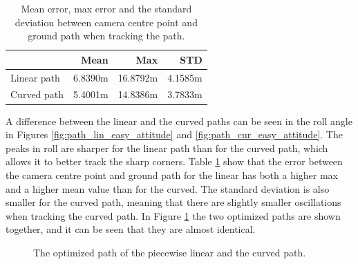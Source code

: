\begin{table}
\centering
\begin{tabular}{l r r r}
    \hline
    & Mean & Max  & STD \\
    \hline
    Linear path & 6.8390m & 16.8792m & 4.1585m \\
    Curved path & 5.4001m & 14.8386m & 3.7833m \\
    \hline
\end{tabular}
\caption{Mean error, max error and the standard deviation between camera centre point and ground path when tracking the path.}
\label{tab:easy_path}
\end{table}

A difference between the linear and the curved paths can be seen in the roll angle in Figures \ref{fig:path_lin_easy_attitude} and \ref{fig:path_cur_easy_attitude}. The peaks in roll are sharper for the linear path than for the curved path, which allows it to better track the sharp corners. Table \ref{tab:easy_path} show that the error between the camera centre point and ground path  for the linear has both a higher max and a higher mean value than for the curved. The standard deviation is also smaller for the curved path, meaning that there are slightly smaller oscillations when tracking the curved path. In Figure \ref{fig:both_optimized_paths} the two optimized paths are shown together, and it can be seen that they are almost identical.

\begin{figure}
	\caption{The optimized path of the piecewise linear and the curved path.}
	\label{fig:both_optimized_paths}
\end{figure}